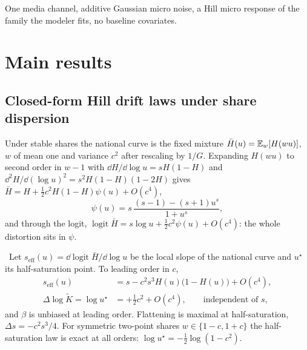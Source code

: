 \begin{assumption}\label{aggregation:ass:family}
One media channel, additive Gaussian micro noise, a Hill micro response of the family the modeler fits, no baseline covariates.
\end{assumption}

\section{Main results}

\subsection{Closed-form Hill drift laws under share dispersion}

Under stable shares the national curve is the fixed mixture $\bar H(u) = \mathbb{E}_w[H(wu)]$, $w$ of mean one and variance $c^2$ after rescaling by $1/G$. Expanding $H(wu)$ to second order in $w - 1$ with $\dd H/\dd\log u = sH(1-H)$ and $\dd^2 H/\dd(\log u)^2 = s^2 H(1-H)(1-2H)$ gives $\bar H = H + \tfrac12 c^2 H(1-H)\psi(u) + O(c^4)$,
\begin{equation}
\psi(u) = s\,\frac{(s-1) - (s+1)u^s}{1 + u^s},
\label{eq:aggregation:psi}
\end{equation}
and through the logit, $\operatorname{logit}\bar H = s\log u + \tfrac12 c^2\psi(u) + O(c^4)$: the whole distortion sits in $\psi$.

\begin{law}\label{aggregation:law:drift}
\tagEstablished\ Let $s_{\mathrm{eff}}(u) = \dd\operatorname{logit}\bar H/\dd\log u$ be the local slope of the national curve and $u^\star$ its half-saturation point. To leading order in $c$,
\begin{align}
s_{\mathrm{eff}}(u) &= s - c^2 s^3 H(u)\bigl(1 - H(u)\bigr) + O(c^4), \label{eq:aggregation:slope}\\
\Delta\log\tilde K = \log u^\star &= +\tfrac12 c^2 + O(c^4), \qquad\text{independent of } s, \label{eq:aggregation:kdrift}
\end{align}
and $\beta$ is unbiased at leading order. Flattening is maximal at half-saturation, $\Delta s = -c^2 s^3/4$. For symmetric two-point shares $w \in \{1-c, 1+c\}$ the half-saturation law is exact at all orders: $\log u^\star = -\tfrac12\log(1-c^2)$.
\end{law}

